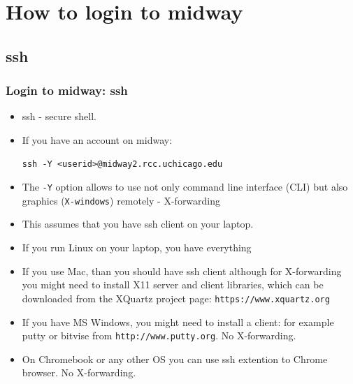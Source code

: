 \section{How to login to midway}

\subsection{ssh}
\begin{frame}[fragile]
  \frametitle{Login to midway: ssh}
  \begin{itemize}
  \item {\color{mycolorcli}ssh} - {\color{mycolordef}s}ecure {\color{mycolordef}sh}ell. 
  \item {\color{mycolordef}If you have an account on midway}:
{\color{mycolorcli}
\begin{verbatim}
ssh -Y <userid>@midway2.rcc.uchicago.edu
\end{verbatim}
}
  \item The {\color{mycolorcli}\verb|-Y|} option allows to use not only command line interface (CLI) but also graphics (\verb|X-windows|) remotely - {\color{mycolordef}X-forwarding}
  \item This assumes that you have ssh client on your laptop.
  \item If you run Linux on your laptop, you have everything
  \item If you use Mac, than you should have ssh client although for X-forwarding you might need to install X11 server and client libraries, 
    which can be downloaded from the XQuartz project page: {\color{mycolorcli}\verb|https://www.xquartz.org|}
  \item If you have MS Windows, you might need to install a client: 
    for example {\color{mycolorcli}putty} or {\color{mycolorcli}bitvise} from  {\color{mycolorcli}\verb|http://www.putty.org|}. No X-forwarding.
  \item On Chromebook or any other OS you can use ssh extention to Chrome browser. No X-forwarding.
  \end{itemize}
\end{frame}

